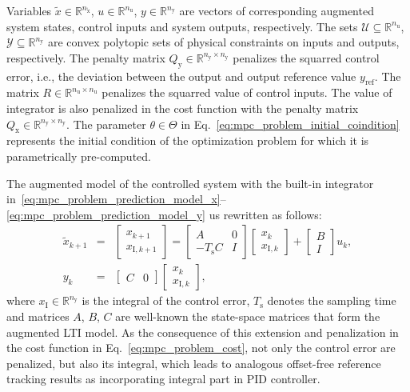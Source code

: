 \documentclass[preprint,12pt]{elsarticle}
\begin{document}
%
Variables $\widetilde{x} \in \mathbb{R}^{n_{\widetilde{\mathrm{x}}}}$, $u \in \mathbb{R}^{n_{\mathrm{u}}}$, $y \in \mathbb{R}^{n_{\mathrm{y}}}$ are vectors of corresponding augmented system states, control inputs and system outputs, respectively. 
%
The sets $\mathcal{U} \subseteq \mathbb{R}^{n_{\mathrm{u}}}$, $\mathcal{Y} \subseteq \mathbb{R}^{n_{\mathrm{y}}}$ are convex polytopic sets of physical constraints on inputs and outputs, respectively. The penalty matrix $Q_\mathrm{y} \in \mathbb{R}^{n_{\mathrm{y}} \times n_{\mathrm{y}}}$ penalizes the squarred control error, i.e., the deviation between the output and output reference value $y_\mathrm{ref}$. The matrix $R \in \mathbb{R}^{n_{\mathrm{u}} \times n_{\mathrm{u}}}$ penalizes the squarred value of control inputs. 
%
The value of integrator is also penalized in the cost function with the penalty matrix $Q_\mathrm{x} \in \mathbb{R}^{n_{\mathrm{y}} \times n_{\mathrm{y}}}$. 
%
The parameter $\theta \in \Theta$ in Eq.~\eqref{eq:mpc_problem_initial_coindition} represents the initial condition of the optimization problem for which it is parametrically pre-computed. 

The augmented model of the controlled system with the built-in integrator in~\eqref{eq:mpc_problem_prediction_model_x}--\eqref{eq:mpc_problem_prediction_model_y} us rewritten as follows:
\begin{subequations}
	\begin{eqnarray} 
		\label{eq:mpc_augmented_model_x} 
		\widetilde{x}_{k+1} &=& \begin{bmatrix} x_{k+1} \\ 	x_{\mathrm{I},k+1}\end{bmatrix} = \begin{bmatrix} A & \textit{0} \\ -T_\mathrm{s} C & I \end{bmatrix} \begin{bmatrix} x_{k} \\ x_{\mathrm{I},k} \end{bmatrix} + \begin{bmatrix} B \\ I \end{bmatrix} u_{k}, \\
		\label{eq:mpc_augmented_model_y}
		y_k &=& \begin{bmatrix} C & \textit{0} \end{bmatrix} \begin{bmatrix} x_{k} \\ x_{\mathrm{I},k} \end{bmatrix},
	\end{eqnarray}
\end{subequations}
where $x_{\mathrm{I}} \in \mathbb{R}^{n_{\mathrm{y}}}$ is the integral of the control error, $T_\mathrm{s}$ denotes the sampling time and matrices $A$, $B$, $C$ are well-known the state-space matrices that form the augmented LTI model. As the consequence of this extension and penalization in the cost function in Eq.~\eqref{eq:mpc_problem_cost}, not only the control error are penalized, but also its integral, which leads to analogous offset-free reference tracking results as incorporating integral part in PID controller.
\end{document}
